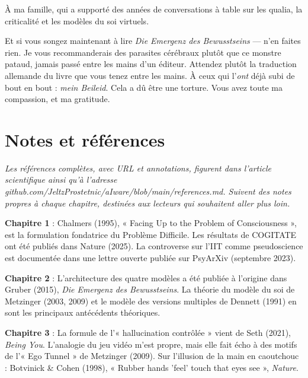 \documentclass[11pt, twoside, openright]{book}
\begin{document}
À ma famille, qui a supporté des années de conversations à table sur les qualia, la criticalité et les modèles du soi virtuels.

Et si vous songez maintenant à lire \textit{Die Emergenz des Bewusstseins} --- n'en faites rien. Je vous recommanderais des parasites cérébraux plutôt que ce monstre pataud, jamais passé entre les mains d'un éditeur. Attendez plutôt la traduction allemande du livre que vous tenez entre les mains. À ceux qui l'\textit{ont} déjà subi de bout en bout : \textit{mein Beileid}. Cela a dû être une torture. Vous avez toute ma compassion, et ma gratitude.


\chapter*{Notes et références}

\textit{Les références complètes, avec URL et annotations, figurent dans l'article scientifique ainsi qu'à l'adresse github.com/\allowbreak{}JeltzProstetnic/\allowbreak{}aIware/\allowbreak{}blob/\allowbreak{}main/\allowbreak{}references.md. Suivent des notes propres à chaque chapitre, destinées aux lecteurs qui souhaitent aller plus loin.}

\textbf{Chapitre 1} : Chalmers (1995), « Facing Up to the Problem of Consciousness », est la formulation fondatrice du Problème Difficile. Les résultats de COGITATE ont été publiés dans Nature (2025). La controverse sur l'IIT comme pseudoscience est documentée dans une lettre ouverte publiée sur PsyArXiv (septembre 2023).

\textbf{Chapitre 2} : L'architecture des quatre modèles a été publiée à l'origine dans Gruber (2015), \textit{Die Emergenz des Bewusstseins}. La théorie du modèle du soi de Metzinger (2003, 2009) et le modèle des versions multiples de Dennett (1991) en sont les principaux antécédents théoriques.

\textbf{Chapitre 3} : La formule de l'« hallucination contrôlée » vient de Seth (2021), \textit{Being You}. L'analogie du jeu vidéo m'est propre, mais elle fait écho à des motifs de l'« Ego Tunnel » de Metzinger (2009). Sur l'illusion de la main en caoutchouc : Botvinick \& Cohen (1998), « Rubber hands 'feel' touch that eyes see », \textit{Nature}.
\end{document}
